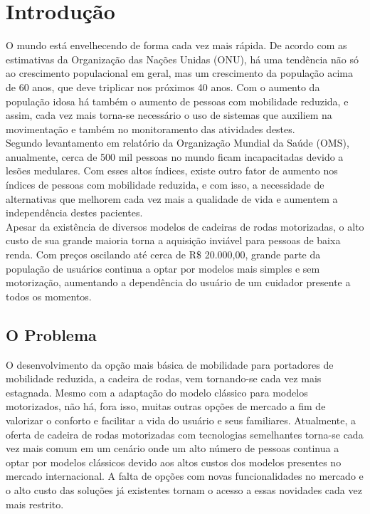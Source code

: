 \chapter{Introdução}

O mundo está envelhecendo de forma cada vez mais rápida. De acordo com as 
estimativas da Organização das Nações Unidas (ONU), há uma tendência não só 
ao crescimento populacional em geral, mas um crescimento da população acima de 60 anos, 
que deve triplicar nos próximos 40 anos. Com o aumento da população idosa há também 
o aumento de pessoas com mobilidade reduzida, e assim, cada vez mais torna-se 
necessário o uso de sistemas que auxiliem na movimentação e também no monitoramento 
das atividades destes.\\

Segundo levantamento em relatório da Organização Mundial da Saúde (OMS), 
anualmente, cerca de 500 mil pessoas no mundo ficam incapacitadas devido a 
lesões medulares. Com esses altos índices, existe outro fator de aumento 
nos índices de pessoas com mobilidade reduzida, e com isso, a necessidade 
de alternativas que melhorem cada vez mais a qualidade de vida e aumentem a 
independência destes pacientes.\\

Apesar da existência de diversos modelos de cadeiras de rodas motorizadas, 
o alto custo de sua grande maioria torna a aquisição inviável para pessoas de 
baixa renda. 
Com preços oscilando até cerca de R\$ 20.000,00, grande parte da população de 
usuários continua a optar por modelos mais simples e sem motorização, aumentando a 
dependência do usuário de um cuidador presente a todos os momentos.\\

\section{O Problema}

O desenvolvimento da opção mais básica de mobilidade para portadores de mobilidade
reduzida, a cadeira de rodas, vem tornando-se cada vez mais estagnada. 
Mesmo com a adaptação do modelo clássico para modelos motorizados, não há, 
fora isso, muitas outras opções de mercado a fim de valorizar o conforto 
e facilitar a vida do usuário e seus familiares. Atualmente, a oferta de 
cadeira de rodas motorizadas com tecnologias semelhantes torna-se cada 
vez mais comum em um cenário onde um alto número de pessoas continua a optar 
por modelos clássicos devido aos altos custos dos modelos presentes no 
mercado internacional. A falta de opções com novas funcionalidades no mercado 
e o alto custo das soluções já existentes tornam o acesso a essas novidades
 cada vez mais restrito.\\
	
